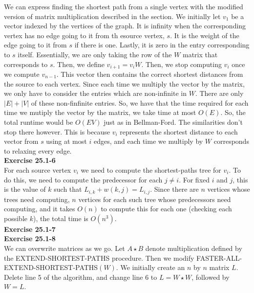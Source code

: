\documentclass{article}
\begin{document}
We can express finding the shortest path from a single vertex with the modified version of matrix multiplication described in the section. We initially let $v_1$ be a vector indexed by the vertices of the graph. It is infinity when the corresponding vertex has no edge going to it from th esource vertex, $s$. It is the weight of the edge going to it from $s$ if there is one. Lastly, it is zero in the entry corresponding to $s$ itself. Essentially, we are only taking the row of the $W$ matrix that corresponds to $s$. Then, we define $v_{i+1} = v_i W$. Then, we stop computing $v_i$ once we compute $v_{n-1}$. This vector then contains the correct shortest distances from the source to each vertex. Since each time we multiply the vector by the matrix, we only have to consider the entries which are non-infinite in $W$. There are only $|E|+|V|$ of these non-finfinite entries. So, we have that the time required for each time we mutiply the vector by the matrix, we take time at most $O(E)$. So, the total runtime would be $O(EV)$ just as in Bellman-Ford. The similarities don't stop there however. This is because $v_i$ represents the shortest distance to each vector from $s$ using at most $i$ edges, and each time we multiply by $W$ corresponds to relaxing every edge.\\

\noindent\textbf{Exercise 25.1-6}\\

For each source vertex $v_i$ we need to compute the shortest-paths tree for $v_i$.  To do this, we need to compute the predecessor for each $j \neq i$.  For fixed $i$ and $j$, this is the value of $k$ such that $L_{i,k} + w(k,j) = L_{i,j}$. Since there are $n$ vertices whose trees need computing, $n$ vertices for each such tree whose predecessors need computing, and it takes $O(n)$ to compute this for each one (checking each possible $k$), the total time is $O(n^3)$. \\

\noindent\textbf{Exercise 25.1-7}\\

\noindent\textbf{Exercise 25.1-8}\\

We can overwrite matrices as we go.  Let $A \star B$ denote multiplication defined by the EXTEND-SHORTEST-PATHS procedure.  Then we modify FASTER-ALL-EXTEND-SHORTEST-PATHS$(W)$.  We initially create an $n$ by $n$ matrix $L$.  Delete line 5 of the algorithm, and change line 6 to $L = W \star W$, followed by $W = L$.\\ 
\end{document}
